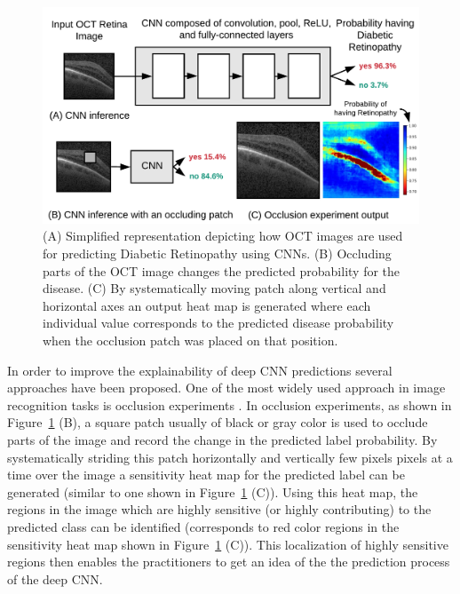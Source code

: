 \begin{figure}[t]
  \includegraphics[width=\columnwidth]{./images/krypton_overview}
  \caption{(A) Simplified representation depicting how OCT images are used for predicting Diabetic Retinopathy using CNNs. (B) Occluding parts of the OCT image changes the predicted probability for the disease. (C) By systematically moving patch along vertical and horizontal axes an output heat map is generated where each individual value corresponds to the predicted disease probability when the occlusion patch was placed on that position.}
  \label{fig:krypton_overview}
\end{figure}

In order to improve the explainability of deep CNN predictions several approaches have been proposed.
One of the most widely used approach in image recognition tasks is occlusion experiments \cite{zeiler2014visualizing}.
In occlusion experiments, as shown in Figure~\ref{fig:krypton_overview} (B), a square patch usually of black or gray color is used to occlude parts of the image and record the change in the predicted label probability.
By systematically striding this patch horizontally and vertically few pixels pixels at a time over the image a sensitivity heat map for the predicted label can be generated (similar to one shown in Figure~\ref{fig:krypton_overview} (C)).
Using this heat map, the regions in the image which are highly sensitive (or highly contributing) to the predicted class can be identified (corresponds to red color regions in the sensitivity heat map shown in Figure~\ref{fig:krypton_overview} (C)).
This localization of highly sensitive regions then enables the practitioners to get an idea of the the prediction process of the deep CNN.

